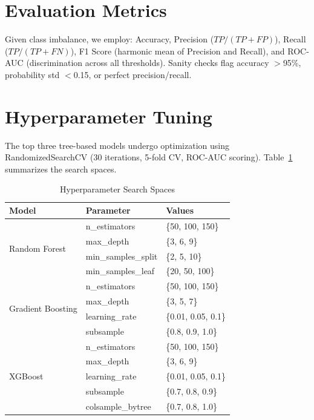 \documentclass[12pt]{report}
\begin{document}
\section{Evaluation Metrics}

Given class imbalance, we employ: Accuracy, Precision ($TP/(TP{+}FP)$), Recall ($TP/(TP{+}FN)$), F1 Score (harmonic mean of Precision and Recall), and ROC-AUC (discrimination across all thresholds). Sanity checks flag accuracy $>$95\%, probability std $<$0.15, or perfect precision/recall.


\section{Hyperparameter Tuning}

The top three tree-based models undergo optimization using RandomizedSearchCV (30 iterations, 5-fold CV, ROC-AUC scoring). Table~\ref{tab:search_spaces} summarizes the search spaces.

\begin{table}[H]
\centering
\caption{Hyperparameter Search Spaces}
\label{tab:search_spaces}
\begin{tabular}{llp{5cm}}
\toprule
\textbf{Model} & \textbf{Parameter} & \textbf{Values} \\
\midrule
\multirow{4}{*}{Random Forest} & n\_estimators & \{50, 100, 150\} \\
 & max\_depth & \{3, 6, 9\} \\
 & min\_samples\_split & \{2, 5, 10\} \\
 & min\_samples\_leaf & \{20, 50, 100\} \\
\midrule
\multirow{4}{*}{Gradient Boosting} & n\_estimators & \{50, 100, 150\} \\
 & max\_depth & \{3, 5, 7\} \\
 & learning\_rate & \{0.01, 0.05, 0.1\} \\
 & subsample & \{0.8, 0.9, 1.0\} \\
\midrule
\multirow{5}{*}{XGBoost} & n\_estimators & \{50, 100, 150\} \\
 & max\_depth & \{3, 6, 9\} \\
 & learning\_rate & \{0.01, 0.05, 0.1\} \\
 & subsample & \{0.7, 0.8, 0.9\} \\
 & colsample\_bytree & \{0.7, 0.8, 1.0\} \\
\bottomrule
\end{tabular}
\end{table}
\end{document}
